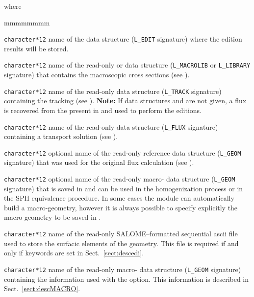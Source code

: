 \noindent
where
\begin{ListeDeDescription}{mmmmmmmm}

\item[\dusa{EDINAM}] {\tt character*12} name of the  data
structure ({\tt L\_EDIT} signature) where the edition results will be stored.

\item[\dusa{LIBNAM}] {\tt character*12} name of the read-only  or
 data structure ({\tt L\_MACROLIB} or {\tt L\_LIBRARY} signature) that contains the
macroscopic cross sections (see ).

\item[\dusa{TRKNAM}] {\tt character*12} name of the read-only  data
structure ({\tt L\_TRACK} signature) containing the tracking (see ). {\bf Note:} If data
structures  and  are not given, a flux is recovered from the 
present in  and used to perform the editions.

\item[\dusa{FLUNAM}] {\tt character*12} name of the read-only  data
structure ({\tt L\_FLUX} signature) containing a transport solution (see ).

\item[\dusa{REFGEO}] {\tt character*12} optional name of the read-only reference  data
structure ({\tt L\_GEOM} signature) that was used for the original flux calculation (see ).

\item[\dusa{MACGEO1}] {\tt character*12} optional name of the read-only macro- data
structure ({\tt L\_GEOM} signature) that is saved in  and can be used in the homogenization
process or in the SPH equivalence procedure. In some cases the
module  can automatically build a macro-geometry, however it is always
possible to specify explicitly the macro-geometry to be saved in .

\item[\dusa{SURFIL}] \texttt{character*12} name of the read-only SALOME--formatted sequential {\sc ascii}
file used to store the surfacic elements of the geometry. This file is required if and only if  
keywords are set in Sect.~\ref{sect:descedi}.

\item[\dusa{MACGEO2}] {\tt character*12} name of the read-only macro- data
structure ({\tt L\_GEOM} signature) containing the information used with the   option. This
information is described in Sect.~\ref{sect:descMACRO}.


\end{ListeDeDescription}
